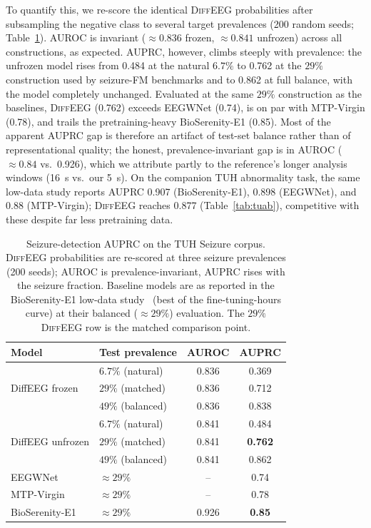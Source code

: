 \documentclass[journal]{IEEEtran}
\newcommand{\best}[1]{\textbf{#1}}
\begin{document}
To quantify this, we re-score the identical \textsc{DiffEEG} probabilities
after subsampling the negative class to several target prevalences (200 random
seeds; Table~\ref{tab:prev}). AUROC is invariant ($\approx\!0.836$ frozen,
$\approx\!0.841$ unfrozen) across all constructions, as expected. AUPRC, however,
climbs steeply with prevalence: the unfrozen model rises from \num{0.484} at the
natural $6.7\%$ to \num{0.762} at the $29\%$ construction used by seizure-FM
benchmarks and to \num{0.862} at full balance, with the model completely
unchanged. Evaluated at the same $29\%$ construction as the baselines,
\textsc{DiffEEG} (\num{0.762}) exceeds EEGWNet (\num{0.74}), is on par with
MTP-Virgin (\num{0.78}), and trails the pretraining-heavy BioSerenity-E1
(\num{0.85}). Most of the apparent AUPRC gap is therefore an artifact of test-set
balance rather than of representational quality; the honest, prevalence-invariant
gap is in AUROC ($\approx\!0.84$ vs.\ \num{0.926}), which we attribute partly to
the reference's longer analysis windows (\SI{16}{\second} vs.\ our
\SI{5}{\second}). On the companion TUH abnormality task, the same low-data study
reports AUPRC \num{0.907} (BioSerenity-E1), \num{0.898} (EEGWNet), and \num{0.88}
(MTP-Virgin); \textsc{DiffEEG} reaches \num{0.877} (Table~\ref{tab:tuab}),
competitive with these despite far less pretraining data.

\begin{table}[t]
\centering
\caption{Seizure-detection AUPRC on the TUH Seizure corpus. \textsc{DiffEEG}
probabilities are re-scored at three seizure prevalences (200 seeds); AUROC is
prevalence-invariant, AUPRC rises with the seizure fraction. Baseline models are
as reported in the BioSerenity-E1 low-data study~\cite{bettinardi2025bioserenity}
(best of the fine-tuning-hours curve) at their balanced ($\approx\!29\%$)
evaluation. The $29\%$ \textsc{DiffEEG} row is the matched comparison point.}
\label{tab:prev}
\small
\begin{tabular}{@{}llcc@{}}
\toprule
Model & Test prevalence & AUROC & AUPRC \\
\midrule
\multirow{3}{*}{DiffEEG frozen}   & $6.7\%$ (natural)  & 0.836 & 0.369 \\
                                  & $29\%$ (matched)   & 0.836 & 0.712 \\
                                  & $49\%$ (balanced)  & 0.836 & 0.838 \\
\midrule
\multirow{3}{*}{DiffEEG unfrozen} & $6.7\%$ (natural)  & 0.841 & 0.484 \\
                                  & $29\%$ (matched)   & 0.841 & \best{0.762} \\
                                  & $49\%$ (balanced)  & 0.841 & 0.862 \\
\midrule
EEGWNet~\cite{bettinardi2025bioserenity}        & $\approx\!29\%$ & -- & 0.74 \\
MTP-Virgin~\cite{bettinardi2025bioserenity}     & $\approx\!29\%$ & -- & 0.78 \\
BioSerenity-E1~\cite{bettinardi2025bioserenity} & $\approx\!29\%$ & 0.926 & \best{0.85} \\
\bottomrule
\end{tabular}
\end{table}
\end{document}
